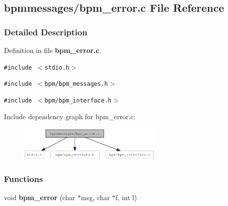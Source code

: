 \subsection{bpmmessages/bpm\_\-error.c File Reference}
\label{bpm__error_8c}


\subsubsection{Detailed Description}


Definition in file {\bf bpm\_\-error.c}.

{\tt \#include $<$stdio.h$>$}\par
{\tt \#include $<$bpm/bpm\_\-messages.h$>$}\par
{\tt \#include $<$bpm/bpm\_\-interface.h$>$}\par


Include dependency graph for bpm\_\-error.c:\nopagebreak
\begin{figure}[H]
\begin{center}
\leavevmode
\includegraphics[width=201pt]{bpm__error_8c__incl}
\end{center}
\end{figure}
\subsubsection*{Functions}
\begin{CompactItemize}
\item 
void {\bf bpm\_\-error} (char $\ast$msg, char $\ast$f, int l)
\end{CompactItemize}
